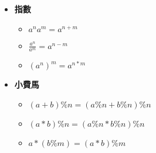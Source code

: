 \begin{itemize}
  \item \textbf{指數}
  \begin{itemize}
    \item $a^na^m = a^{n+m}$
    \item $\frac{a^n}{a^m} = a^{n-m}$
    \item $(a^n)^m = a^{n*m}$
  \end{itemize}

  \item \textbf{小費馬}
  \begin{itemize}
    \item $(a+b)\%n = (a\%n+b\%n)\%n$
    \item $(a*b)\%n = (a\%n*b\%n)\%n$
    \item $a*(b\%m) = (a*b)\%m$
  \end{itemize}
\end{itemize}
